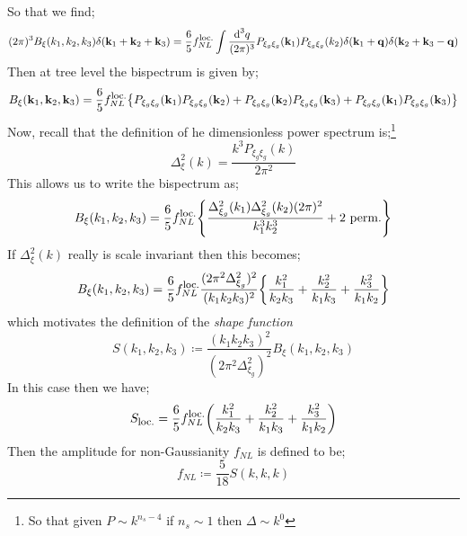So that we find;
\begin{dmath*}
(2\pi)^3 B_{\xi}(k_1, k_2, k_3) \delta(\vec{k}_1 + \vec{k}_2 + \vec{k}_3) = \frac{6}{5}f_{NL}^{\text{\footnotesize{loc.}}}\int{\frac{\ud^3 q}{(2\pi)^3}P_{\xi_g \xi_g}(\vec{k}_1)P_{\xi_g \xi_g}(k_2)\delta(\vec{k}_1 + \vec{q}) \delta(\vec{k}_2 + \vec{k}_3 - \vec{q})}
\end{dmath*}
Then at tree level the bispectrum is given by;
\begin{dmath}
B_{\xi}(\vec{k}_1, \vec{k}_2, \vec{k}_3) = \frac{6}{5}f_{NL}^{\text{\footnotesize{loc.}}}\set{P_{\xi_g \xi_g}(\vec{k}_1)P_{\xi_g \xi_g}(\vec{k}_2) + P_{\xi_g \xi_g}(\vec{k}_2)P_{\xi_g \xi_g}(\vec{k}_3) + P_{\xi_g \xi_g}(\vec{k}_1)P_{\xi_g \xi_g}(\vec{k}_3)}
\end{dmath}
Now, recall that the definition of he dimensionless power spectrum is;\footnote{So that given $P \sim k^{n_s - 4}$ if $n_s \sim 1$ then $\Delta \sim k^{0}$}
\begin{equation*}
\Delta_\xi^{2}(k) = \frac{k^3 P_{\xi_g\xi_g}(k)}{2\pi^2}
\end{equation*}
This allows us to write the bispectrum as;
\begin{equation*}
B_{\xi}(k_1, k_2, k_3) = \frac{6}{5}f_{NL}^{\text{\footnotesize{loc.}}}\set{\frac{\Delta^2_{\xi_g}(k_1)\Delta^2_{\xi_g}(k_2)(2\pi)^2}{k_1^3 k_2^3} + \text{2 perm.}}
\end{equation*}
If $\Delta^2_\xi(k)$ really is scale invariant then this becomes;
\begin{equation*}
B_\xi(k_1, k_2, k_3) = \frac{6}{5}f_{NL}^{\text{\footnotesize{loc.}}}\frac{(2\pi^2 \Delta^2_{\xi_g})^2}{(k_1 k_2 k_3)^2} \set{\frac{k_1^2}{k_2 k_3} + \frac{k_2^2}{k_1 k_3} + \frac{k_3^2}{k_1 k_2}}
\end{equation*}
which motivates the definition of the \emph{shape function}
\begin{equation}
S(k_1, k_2, k_3) \coloneqq \frac{(k_1 k_2 k_3)^2}{(2\pi^2 \Delta^2_{\xi_g})^2}B_{\xi}(k_1, k_2, k_3)
\end{equation}
In this case then we have;
\begin{equation*}
S_{\text{\footnotesize{loc.}}} = \frac{6}{5}f_{NL}^{\text{\footnotesize{loc.}}}\left(\frac{k_1^2}{k_2 k_3} + \frac{k_2^2}{k_1 k_3} + \frac{k_3^2}{k_1 k_2}\right)
\end{equation*}
Then the amplitude for non-Gaussianity $f_{NL}$ is defined to be;
\begin{equation}
f_{NL} \coloneqq \frac{5}{18}S(k, k, k)
\end{equation}
